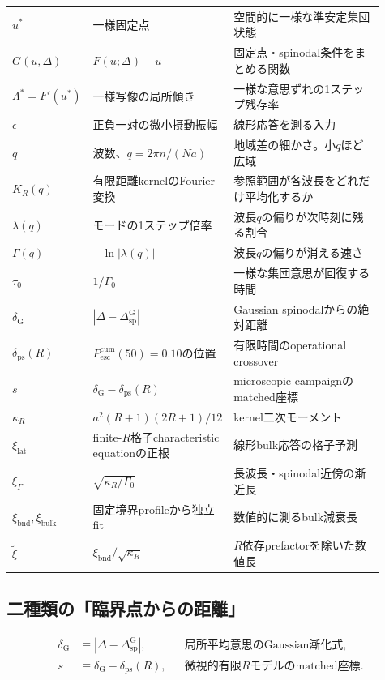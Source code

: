 \documentclass[a4paper,12pt]{ltjsarticle}
\newcommand{\Gauss}{\mathrm G}
\newcommand{\bnd}{\mathrm{bnd}}
\newcommand{\bulk}{\mathrm{bulk}}
\begin{document}
\begin{longtable}{>{\centering\arraybackslash}p{0.16\linewidth}p{0.29\linewidth}p{0.46\linewidth}}
$u^*$ & 一様固定点 & 空間的に一様な準安定集団状態 \\
$G(u,\Delta)$ & $F(u;\Delta)-u$ & 固定点・spinodal条件をまとめる関数 \\
$\Lambda^*=F'(u^*)$ & 一様写像の局所傾き & 一様な意思ずれの1ステップ残存率 \\
$\epsilon$ & 正負一対の微小摂動振幅 & 線形応答を測る入力 \\
$q$ & 波数、$q=2\pi n/(Na)$ & 地域差の細かさ。小$q$ほど広域 \\
$K_R(q)$ & 有限距離kernelのFourier変換 & 参照範囲が各波長をどれだけ平均化するか \\
$\lambda(q)$ & モードの1ステップ倍率 & 波長$q$の偏りが次時刻に残る割合 \\
$\Gamma(q)$ & $-\ln|\lambda(q)|$ & 波長$q$の偏りが消える速さ \\
$\tau_0$ & $1/\Gamma_0$ & 一様な集団意思が回復する時間 \\
$\delta_{\Gauss}$ & $|\Delta-\Delta_{\mathrm{sp}}^{\Gauss}|$ & Gaussian spinodalからの絶対距離 \\
$\delta_{\mathrm{ps}}(R)$ & $P_{\mathrm{esc}}^{\mathrm{cum}}(50)=0.10$の位置 & 有限時間のoperational crossover \\
$s$ & $\delta_{\Gauss}-\delta_{\mathrm{ps}}(R)$ & microscopic campaignのmatched座標 \\
$\kappa_R$ & $a^2(R+1)(2R+1)/12$ & kernel二次モーメント \\
$\xi_{\mathrm{lat}}$ & finite-$R$格子characteristic equationの正根 & 線形bulk応答の格子予測 \\
$\xi_{\Gamma}$ & $\sqrt{\kappa_R/\Gamma_0}$ & 長波長・spinodal近傍の漸近長 \\
$\xi_{\bnd},\xi_{\bulk}$ & 固定境界profileから独立fit & 数値的に測るbulk減衰長 \\
$\widetilde\xi$ & $\xi_{\bnd}/\sqrt{\kappa_R}$ & $R$依存prefactorを除いた数値長 \\
\bottomrule
\end{longtable}

\subsection{二種類の「臨界点からの距離」}\label{subsec:two-distances}

\begin{align}
  \delta_{\Gauss}
    &\equiv \left|\Delta-\Delta_{\mathrm{sp}}^{\Gauss}\right|,
    &&\text{局所平均意思のGaussian漸化式},\label{eq:delta-gauss}\\
  s
    &\equiv \delta_{\Gauss}-\delta_{\mathrm{ps}}(R),
    &&\text{微視的有限$R$モデルのmatched座標}.\label{eq:matched-s}
\end{align}
\end{document}
